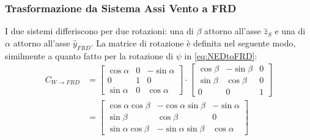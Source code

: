 \subsubsection{Trasformazione da Sistema Assi Vento a FRD}
I due sistemi differiscono per due rotazioni: una di $\beta$ attorno all'asse $\hat{z}_{S}$ e una di $\alpha$ attorno all'asse $\hat{y}_{FRD}$. La matrice di rotazione è definita nel seguente modo, similmente a quanto fatto per la rotazione di $\psi$ in \eqref{eq:NEDtoFRD}:
\begin{equation}
    \label{eq:WtoFRD}
    \begin{split}
        C_{W \rightarrow FRD} & = \begin{bmatrix}
                                      \cos\alpha & 0 & -\sin\alpha \\
                                      0          & 1 & 0           \\
                                      \sin\alpha & 0 & \cos\alpha
                                  \end{bmatrix} \cdot \begin{bmatrix}
                                                          \cos\beta & -\sin\beta & 0 \\
                                                          \sin\beta & \cos\beta  & 0 \\
                                                          0         & 0          & 1
                                                      \end{bmatrix} \\ &= \begin{bmatrix}
            \cos\alpha\cos\beta & -\cos\alpha\sin\beta & -\sin\alpha \\
            \sin\beta           & \cos\beta            & 0           \\
            \sin\alpha\cos\beta & -\sin\alpha\sin\beta & \cos\alpha
        \end{bmatrix}
    \end{split}
\end{equation}
